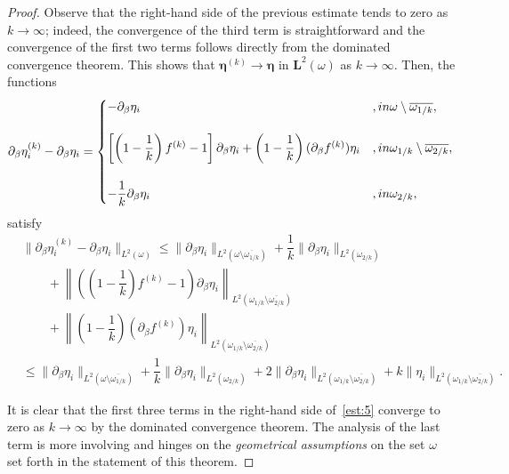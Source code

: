\documentclass{amsart}
\begin{document}
\begin{proof}
	Observe that the right-hand side of the previous estimate tends to zero as $k\to\infty$; indeed, the convergence of the third term is straightforward and the convergence of the first two terms follows directly from the dominated convergence theorem. This shows that $\bm{\eta}^{(k)} \to \bm{\eta}$ in $\bm{L}^2(\omega)$ as $k\to\infty$.
	Then, the functions
	\begin{equation*}
		\partial_\beta\eta_i^{(k)}-\partial_\beta\eta_i=
		\begin{cases}
			-\partial_\beta\eta_i&, \textup{ in }\omega\setminus\overline{\omega_{1/k}},\\
			\\
			\left[\left(1-\dfrac{1}{k}\right)f^{(k)}-1\right]\partial_\beta\eta_i+\left(1-\dfrac{1}{k}\right)(\partial_\beta f^{(k)}) \eta_i&, \textup{ in }\omega_{1/k}\setminus\overline{\omega_{2/k}},\\
			\\
			-\dfrac{1}{k}\partial_\beta\eta_i&, \textup{ in }\omega_{2/k},
		\end{cases}
	\end{equation*}
	satisfy
	\begin{equation}
		\label{est:5}
		\begin{aligned}
			&\|\partial_\beta\eta_i^{(k)}-\partial_\beta\eta_i\|_{L^2(\omega)}\le\|\partial_\beta\eta_i\|_{L^2(\omega\setminus\overline{\omega_{1/k}})}+\dfrac{1}{k}\|\partial_\beta\eta_i\|_{L^2(\omega_{2/k})}\\
			&\qquad+\left\|\left(\left(1-\dfrac{1}{k}\right)f^{(k)}-1\right)\partial_\beta\eta_i\right\|_{L^2(\omega_{1/k}\setminus\overline{\omega_{2/k}})}\\
			&\qquad+\left\|\left(1-\dfrac{1}{k}\right)(\partial_\beta f^{(k)})\eta_i\right\|_{L^2(\omega_{1/k}\setminus\overline{\omega_{2/k}})}\\
			&\le \|\partial_\beta\eta_i\|_{L^2(\omega\setminus\overline{\omega_{1/k}})}+\dfrac{1}{k}\|\partial_\beta\eta_i\|_{L^2(\omega_{2/k})}+2\|\partial_\beta\eta_i\|_{L^2(\omega_{1/k}\setminus\overline{\omega_{2/k}})}+k\|\eta_i\|_{L^2(\omega_{1/k}\setminus\overline{\omega_{2/k}})}.
		\end{aligned}
	\end{equation}
	
	It is clear that the first three terms in the right-hand side of~\eqref{est:5} converge to zero as $k\to\infty$ by the dominated convergence theorem.
	The analysis of the last term is more involving and hinges on the \emph{geometrical assumptions} on the set $\omega$ set forth in the statement of this theorem.
	

\end{proof}
\end{document}

